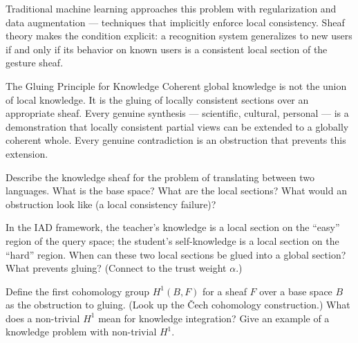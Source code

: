 \begin{remark}
  Traditional machine learning approaches this problem with regularization
  and data augmentation — techniques that implicitly enforce local
  consistency. Sheaf theory makes the condition explicit: a recognition
  system generalizes to new users if and only if its behavior on known
  users is a consistent local section of the gesture sheaf.
\end{remark}

\begin{namedthm}{The Gluing Principle for Knowledge}
  Coherent global knowledge is not the union of local knowledge.
  It is the gluing of locally consistent sections over an appropriate
  sheaf. Every genuine synthesis — scientific, cultural, personal —
  is a demonstration that locally consistent partial views can be
  extended to a globally coherent whole. Every genuine contradiction
  is an obstruction that prevents this extension.
\end{namedthm}

\begin{exercise}
  Describe the knowledge sheaf for the problem of translating between
  two languages. What is the base space? What are the local sections?
  What would an obstruction look like (a local consistency failure)?
\end{exercise}

\begin{exercise}
  In the IAD framework, the teacher's knowledge is a local section on
  the ``easy'' region of the query space; the student's self-knowledge
  is a local section on the ``hard'' region. When can these two local
  sections be glued into a global section? What prevents gluing?
  (Connect to the trust weight $\alpha$.)
\end{exercise}

\begin{exercise}[title={Mathematical}]
  Define the first cohomology group $H^1(B, F)$ for a sheaf $F$ over
  a base space $B$ as the obstruction to gluing. (Look up the Čech
  cohomology construction.) What does a non-trivial $H^1$ mean for
  knowledge integration? Give an example of a knowledge problem with
  non-trivial $H^1$.
\end{exercise}

